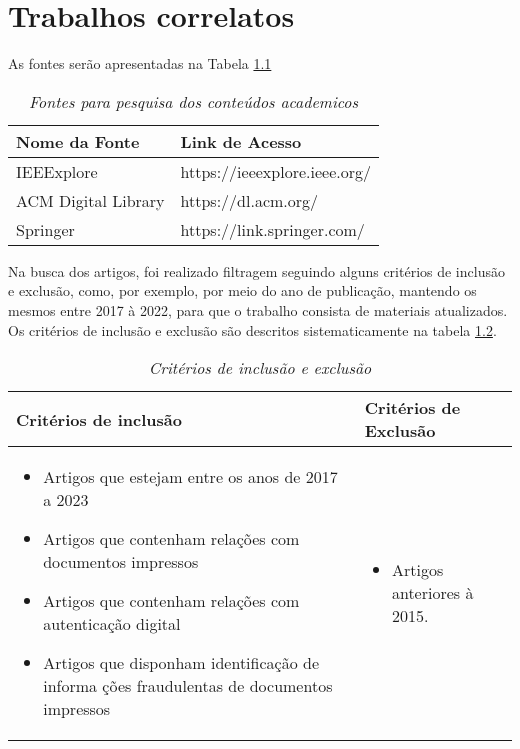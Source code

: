 \chapter{Trabalhos correlatos}\label{ch:trabalhos-correlatos}
As fontes serão apresentadas na Tabela \ref{tab:fontes-pesquisa}
\begin{table}[h!]
    \centering
    \begin{tabular}{|m{4cm}|m{4cm}|}
        \hline
        Nome da Fonte       & Link de Acesso               \\ \hline

        IEEExplore          & https://ieeexplore.ieee.org/ \\ \hline
        ACM Digital Library & https://dl.acm.org/          \\ \hline
        Springer            & https://link.springer.com/   \\ \hline
    \end{tabular}
    \caption[Fontes de pesquisa]{\textit{Fontes para pesquisa dos
    conteúdos academicos}}
    \label{tab:fontes-pesquisa}
\end{table}
Na busca dos artigos, foi realizado filtragem seguindo alguns
critérios de inclusão e exclusão, como, por exemplo, por meio do
ano de publicação, mantendo os mesmos entre 2017 à 2022, para que o
trabalho consista de materiais atualizados.
Os critérios de inclusão e exclusão são descritos sistematicamente
na tabela \ref{tab:criterios-exclusao}.
\newpage
\begin{table}[h!]
    \centering
    \begin{tabular}{|m{4cm}|m{4cm}|}
        \hline
        Critérios de inclusão & Critérios de Exclusão \\ \hline
        \begin{itemize}[leftmargin=10px]
            \item Artigos que estejam entre os anos de 2017 a 2023
            \item Artigos que contenham relações com documentos
            impressos
            \item Artigos que contenham relações com autenticação
            digital
            \item Artigos que disponham identificação de informa
            ções fraudulentas de documentos impressos
        \end{itemize} &
        \begin{itemize}[leftmargin=10px]
            \item Artigos anteriores à 2015.
        \end{itemize} \\ \hline
    \end{tabular}
    \caption[Critérios de inclusão e exclusão]{\textit{Critérios de
    inclusão e exclusão}}
    \label{tab:criterios-exclusao}
\end{table}

